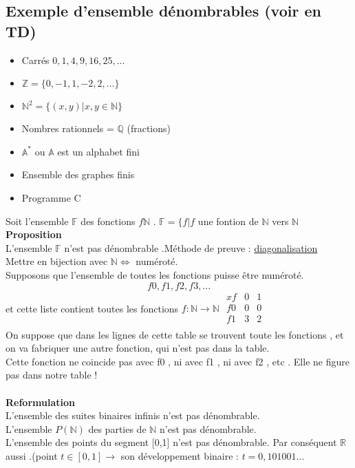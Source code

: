 \documentclass[base.tex]{subfiles}
\begin{document}
\subsection{Exemple d'ensemble dénombrables (voir en TD)}
\begin{itemize}
\item Carrés ${0,1,4,9,16,25,...}$
\item $\mathbb{Z} = \{0,-1,1,-2,2,...\}$
\item $\mathbb{N}^{2}=\{(x,y)|x,y \in \mathbb{N}\}$
\item Nombres rationnels = $\mathbb{Q}$ (fractions)
\item $\mathbb{A}^*$ ou $\mathbb{A}$ est un alphabet fini
\item Ensemble des graphes finis
\item Programme C
\end{itemize}
Soit l'ensemble $\mathbb{F}$ des fonctions $f\mathbb{N}$ .
$\mathbb{F} = \{f|f$ une fontion de $\mathbb{N}$ vers $\mathbb{N}$
\\
\textbf{Proposition}
\\
L'ensemble $\mathbb{F}$ n'est pas dénombrable .Méthode de preuve : \underline{diagonalisation}
\\
Mettre en bijection avec $\mathbb{N} \Leftrightarrow $  numéroté.\\
Supposons que l'ensemble de toutes les fonctions puisse être numéroté.
\[f0,f1,f2,f3,...\]
et cette liste contient toutes les fonctions $f:\mathbb{N}\rightarrow\mathbb{N}$
$\begin{array}{l|cr}xf & 0 & 1\\ \hline f0 & 0 & 0\\ f1 & 3 & 2\\\end{array}$
  \\
  On suppose que dans les lignes de cette table se trouvent toute les fonctions , et on va fabriquer une autre fonction, qui n'est pas dans la table.
\\
Cette fonction ne coincide pas avec f0 , ni avec f1 , ni avec f2 , etc .
Elle ne figure pas dans notre table !
\\
\\
\textbf{Reformulation}\\
L'ensemble des suites binaires infinis n'est pas dénombrable.\\
L'ensemble $P(\mathbb{N})$ des parties de $\mathbb{N}$ n'est pas dénombrable.\\
L'ensemble des points du segment [0,1] n'est pas dénombrable. Par conséquent $\mathbb{R}$ aussi .(point $t\in [0,1] \rightarrow$ son développement binaire : $t=0,101001...$
\\
\\
\end{document}
